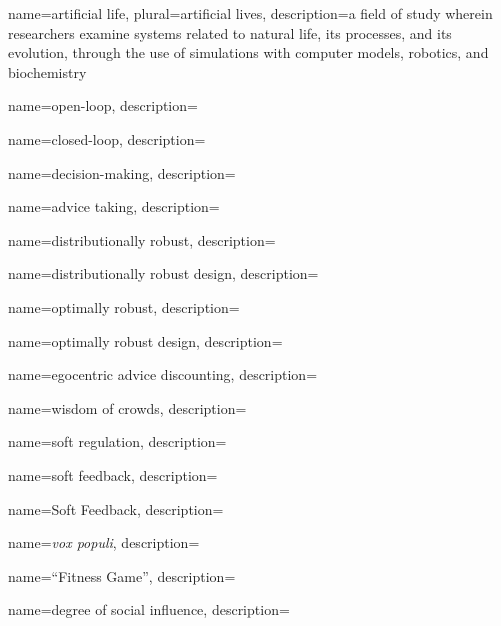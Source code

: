 

	{
		name={artificial life},
		plural={artificial lives},
		description={a field of study wherein researchers examine systems related to natural life, its processes, and its evolution, through the use of simulations with computer models, robotics, and biochemistry}
	}

	{
		name={open-loop},
		description={}
	}

	{
		name={closed-loop},
		description={}
	}	
	
	{
		name={decision-making},
		description={}
	}

	{
		name={advice taking},
		description={}
	}	
	
	{
		name={distributionally robust},
		description={}
	}
	
	{
		name={distributionally robust design},
		description={}
	}	

	{
		name={optimally robust},
		description={}
	}

	{
		name={optimally robust design},
		description={}
	}

	{
		name={egocentric advice discounting},
		description={}
	}
	
	{
		name={wisdom of crowds},
		description={}
	}

	{
		name={soft regulation},
		description={}
	}

	{
		name={soft feedback},
		description={}
	}

	{
		name={Soft Feedback},
		description={}
	}	
	
	{
		name={{\it vox populi}},
		description={}
	}

	{
		name={``Fitness Game''},
		description={}
	}

	{
		name={degree of social influence},
		description={}
	}

